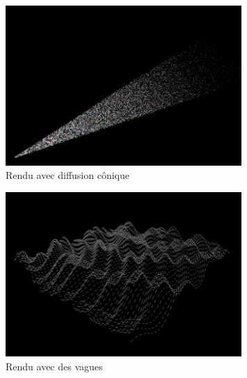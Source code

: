 \begin{figure}[h]
	\begin{center}
		\includegraphics[width=0.8\textwidth]{img/22-cone.png}
	\end{center}
	\caption{Rendu avec diffusion cônique}
\end{figure}

\begin{figure}[h]
	\begin{center}
		\includegraphics[width=0.8\textwidth]{img/23-waves.png}
	\end{center}
	\caption{Rendu avec des vagues}
\end{figure}
